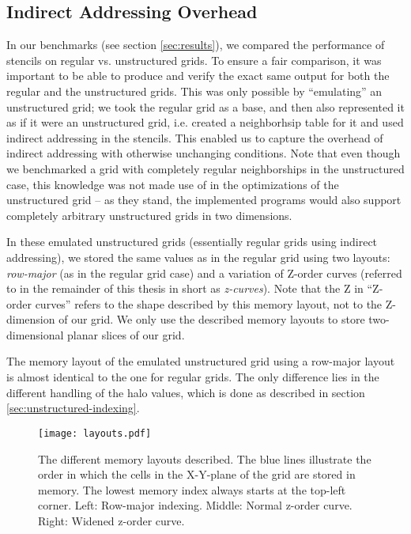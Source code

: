 \subsection{Indirect Addressing Overhead} \label{sec:emulating}

In our benchmarks (see section \ref{sec:results}), we compared the performance of stencils on regular vs. unstructured grids. To ensure a fair comparison, it was important to be able to produce and verify the exact same output for both the regular and the unstructured grids. This was only possible by ``emulating'' an unstructured grid; we took the regular grid as a base, and then also represented it as if it were an unstructured grid, i.e. created a neighborhsip table for it and used indirect addressing in the stencils. This enabled us to capture the overhead of indirect addressing with otherwise unchanging conditions. Note that even though we benchmarked a grid with completely regular neighborships in the unstructured case, this knowledge was not made use of in the optimizations of the unstructured grid -- as they stand, the implemented programs would also support completely arbitrary unstructured grids in two dimensions.

In these emulated unstructured grids (essentially regular grids using indirect addressing), we stored the same values as in the regular grid using two layouts: \emph{row-major} (as in the regular grid case) and a variation of Z-order curves (referred to in the remainder of this thesis in short as \emph{z-curves}). Note that the Z in ``Z-order curves'' refers to the shape described by this memory layout, not to the Z-dimension of our grid. We only use the described memory layouts to store two-dimensional planar slices of our grid.

The memory layout of the emulated unstructured grid using a row-major layout is almost identical to the one for regular grids. The only difference lies in the different handling of the halo values, which is done as described in section \ref{sec:unstructured-indexing}. 

\begin{figure}
	\begin{center}
    \texttt{[image: layouts.pdf]}
	\end{center}
    \caption{\label{fig:layouts} The different memory layouts described. The blue lines illustrate the order in which the cells in the X-Y-plane of the grid are stored in memory. The lowest memory index always starts at the top-left corner. Left: Row-major indexing. Middle: Normal z-order curve. Right: Widened z-order curve.}
\end{figure}

